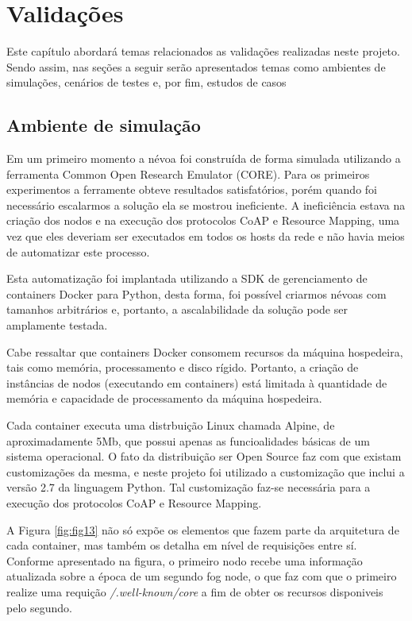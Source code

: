 \chapter{\label{chap:chap4} Validações}


Este capítulo abordará temas relacionados as validações realizadas neste projeto.
Sendo assim, nas seções a seguir serão apresentados temas como ambientes de simulações, cenários de testes e, por fim, estudos de casos


\section{Ambiente de simulação}

Em um primeiro momento a névoa foi construída de forma simulada utilizando a ferramenta Common Open Research Emulator (CORE)\cite{coregui}.
Para os primeiros experimentos a ferramente obteve resultados satisfatórios, porém quando foi necessário escalarmos a solução ela se mostrou ineficiente.
A ineficiência estava na criação dos nodos e na execução dos protocolos CoAP e Resource Mapping, uma vez que eles deveriam ser executados em todos os hosts da rede e não havia 
meios de automatizar este processo.

Esta automatização foi implantada utilizando a SDK de gerenciamento de containers Docker para Python, desta forma, foi possível criarmos névoas com tamanhos arbitrários
e, portanto, a ascalabilidade da solução pode ser amplamente testada\cite{dockersdk:2018}.

Cabe ressaltar que containers Docker\cite{docker:2018} consomem recursos da máquina hospedeira, tais como memória, processamento e disco rígido.
Portanto, a criação de instâncias de nodos (executando em containers) está limitada à quantidade de memória e capacidade de processamento da máquina hospedeira.


Cada container executa uma distrbuição Linux chamada Alpine, de aproximadamente 5Mb, que possui apenas as funcioalidades básicas de um sistema operacional\cite{linuxalpine:2018}.
O fato da distribuição ser Open Source faz com que existam customizações da mesma, e neste projeto foi utilizado a customização que inclui a versão 2.7 da linguagem Python.
Tal customização faz-se necessária para a execução dos protocolos CoAP e Resource Mapping.


A Figura \ref{fig:fig13} não só expõe os elementos que fazem parte da arquitetura de cada container, mas também os detalha em nível de requisições entre sí.
Conforme apresentado na figura, o primeiro nodo recebe uma informação atualizada sobre a época de um segundo fog node, o que faz com que o primeiro realize uma requição \textit{/.well-known/core} a fim de obter os recursos disponiveis pelo segundo.

